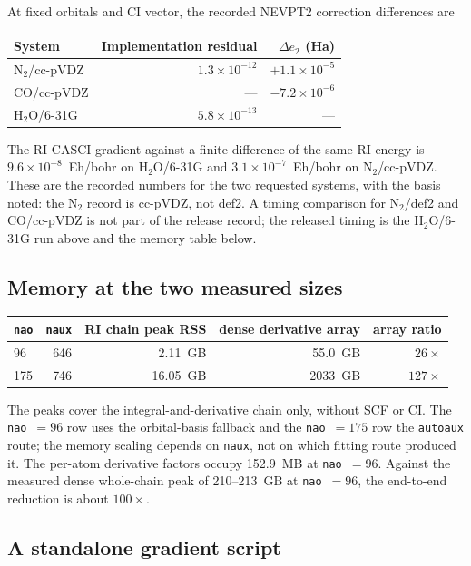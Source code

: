At fixed orbitals and CI vector, the recorded NEVPT2 correction
differences are
\begin{center}
\small
\begin{tabular}{lrr}
\toprule
System & Implementation residual & $\Delta e_2$ (Ha) \\
\midrule
N$_2$/cc-pVDZ & $1.3\times10^{-12}$ & $+1.1\times10^{-5}$ \\
CO/cc-pVDZ    & ---                 & $-7.2\times10^{-6}$ \\
H$_2$O/6-31G  & $5.8\times10^{-13}$ & --- \\
\bottomrule
\end{tabular}
\end{center}
The RI-CASCI gradient against a finite difference of the same RI energy
is $9.6\times10^{-8}$~Eh/bohr on H$_2$O/6-31G and
$3.1\times10^{-7}$~Eh/bohr on N$_2$/cc-pVDZ.  These are the recorded
numbers for the two requested systems, with the basis noted: the N$_2$
record is cc-pVDZ, not def2.  A timing comparison for N$_2$/def2 and
CO/cc-pVDZ is not part of the release record; the released timing is
the H$_2$O/6-31G run above and the memory table below.

\subsection{Memory at the two measured sizes}

\begin{center}
\small
\begin{tabular}{lrrrr}
\toprule
\texttt{nao} & \texttt{naux} & RI chain peak RSS & dense derivative array
  & array ratio \\
\midrule
96  & 646 & 2.11~GB  & 55.0~GB  & $26\times$ \\
175 & 746 & 16.05~GB & 2033~GB  & $127\times$ \\
\bottomrule
\end{tabular}
\end{center}
The peaks cover the integral-and-derivative chain only, without SCF or
CI.  The \texttt{nao}~$=96$ row uses the orbital-basis fallback and the
\texttt{nao}~$=175$ row the \texttt{autoaux} route; the memory scaling
depends on \texttt{naux}, not on which fitting route produced it.  The
per-atom derivative factors occupy 152.9~MB at \texttt{nao}~$=96$.
Against the measured dense whole-chain peak of 210--213~GB at
\texttt{nao}~$=96$, the end-to-end reduction is about $100\times$.

\subsection{A standalone gradient script}

